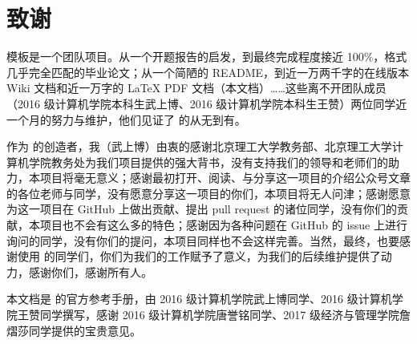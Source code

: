 \section{致谢}

{\BIThesis} 模板是一个团队项目。从一个开题报告的启发，到最终完成程度接近 100\%，格式几乎完全匹配的毕业论文；从一个简陋的 README，到近一万两千字的在线版本 Wiki 文档和近一万字的 {\LaTeX} PDF 文档（本文档）……这些离不开团队成员（2016 级计算机学院本科生武上博、2016 级计算机学院本科生王赞）两位同学近一个月的努力与维护，他们见证了 {\BIThesis} 的从无到有。

作为 {\BIThesis} 的创造者，我（武上博）由衷的感谢北京理工大学教务部、北京理工大学计算机学院教务处为我们项目提供的强大背书，没有支持我们的领导和老师们的助力，本项目将毫无意义；感谢最初打开、阅读、与分享这一项目的介绍公众号文章的各位老师与同学，没有愿意分享这一项目的你们，本项目将无人问津；感谢愿意为这一项目在 GitHub 上做出贡献、提出 pull request 的诸位同学，没有你们的贡献，本项目也不会有这么多的特色；感谢因为各种问题在 GitHub 的 issue 上进行询问的同学，没有你们的提问，本项目同样也不会这样完善。当然，最终，也要感谢使用 {\BIThesis} 的同学们，你们为我们的工作赋予了意义，为我们的后续维护提供了动力，感谢你们，感谢所有人。

本文档是 {\BIThesis} 的官方参考手册，由 2016 级计算机学院武上博同学、2016 级计算机学院王赞同学撰写，感谢 2016 级计算机学院唐誉铭同学、2017 级经济与管理学院詹熠莎同学提供的宝贵意见。
